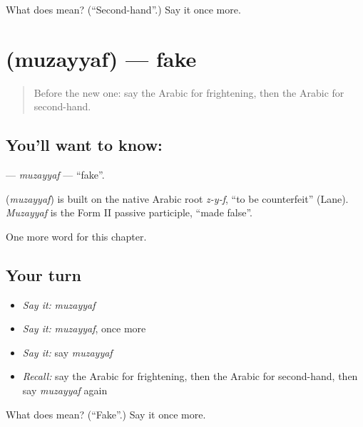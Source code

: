 \begin{tcolorbox}[breakable,colback=teal!4,colframe=teal!35!black,title={Before you move on}]
What does  mean? (\textquotedblleft{}Second-hand\textquotedblright{}.) Say it once more.
\end{tcolorbox}
\section[\texorpdfstring{\ar{مزيف} (muzayyaf)}{مزيف (muzayyaf)}]{ (muzayyaf) — fake}

\label{lesson:AR-C243-muzayyaf}



\begin{quote}
Before the new one: say the Arabic for frightening, then the Arabic for second-hand.
\end{quote}

\subsection*{You'll want to know: }
\textbf{} — \emph{muzayyaf} — \textquotedblleft{}fake\textquotedblright{}.

\begin{cousinweb}
\textbf{} (\emph{muzayyaf}) is built on the native Arabic root \emph{z-y-f}, \textquotedblleft{}to be counterfeit\textquotedblright{} (Lane). \emph{Muzayyaf} is the Form II passive participle, \textquotedblleft{}made false\textquotedblright{}.
\end{cousinweb}

\begin{grammarlens}[title={What you've built}]
One more word for this chapter.
\end{grammarlens}

\subsection*{Your turn}
\begin{itemize}
\raggedright
  \item \emph{Say it:} \emph{muzayyaf}
  \item \emph{Say it:} \emph{muzayyaf}, once more
  \item \emph{Say it:} say \emph{muzayyaf}
  \item \emph{Recall:} say the Arabic for frightening, then the Arabic for second-hand, then say \emph{muzayyaf} again
\end{itemize}

\begin{tcolorbox}[breakable,colback=teal!4,colframe=teal!35!black,title={Before you move on}]
What does  mean? (\textquotedblleft{}Fake\textquotedblright{}.) Say it once more.
\end{tcolorbox}
